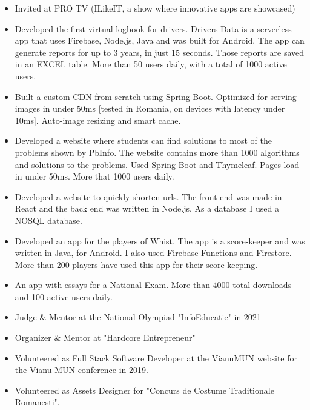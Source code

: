 \begin{itemize}
    \item Invited at PRO TV (ILikeIT, a show where innovative apps are showcased)
\end{itemize}

\begin{itemize}
    \item Developed the first virtual logbook for drivers.
    Drivers Data is a serverless app that uses Firebase, Node.js, Java and was built for Android.
    The app can generate reports for up to 3 years, in just 15 seconds.
    Those reports are saved in an EXCEL table.
    More than 50 users daily, with a total of 1000 active users.
\end{itemize}
\begin{itemize}
    \item Built a custom CDN from scratch using Spring Boot.
    Optimized for serving images in under 50ms [tested in Romania, on devices with latency under 10ms].
    Auto-image resizing and smart cache.
\end{itemize}
\begin{itemize}
    \item Developed a website where students can find solutions to most of the problems shown by PbInfo.
    The website contains more than 1000 algorithms and solutions to the problems.
    Used Spring Boot and Thymeleaf.
    Pages load in under 50ms.
    More that 1000 users daily.
\end{itemize}
\begin{itemize}
    \item Developed a website to quickly shorten urls.
    The front end was made in React and the back end was written in Node.js.
    As a database I used a NOSQL database.
\end{itemize}
\begin{itemize}
    \item Developed an app for the players of Whist.
    The app is a score-keeper and was written in Java, for Android.
    I also used Firebase Functions and Firestore.
    More than 200 players have used this app for their score-keeping.
\end{itemize}
\begin{itemize}
    \item An app with essays for a National Exam.
    More than 4000 total downloads and 100 active users daily.
\end{itemize}
\begin{itemize}
    \item Judge \& Mentor at the National Olympiad "InfoEducatie" in 2021
    \item Organizer \& Mentor at "Hardcore Entrepreneur"
    \item Volunteered as Full Stack Software Developer at the VianuMUN website for the Vianu MUN conference in 2019.
    \item Volunteered as Assets Designer for "Concurs de Costume Traditionale Romanesti".
\end{itemize}